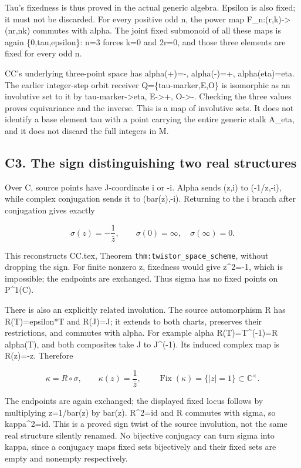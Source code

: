\documentclass[
]{article}
\newcounter{none} %
\begin{document}
Tau's fixedness is thus proved in the actual generic algebra. Epsilon is
also fixed; it must not be discarded. For every positive odd n, the
power map F\_n:(r,k)-\textgreater(nr,nk) commutes with alpha. The joint
fixed submonoid of all these maps is again \{0,tau,epsilon\}: n=3 forces
k=0 and 2r=0, and those three elements are fixed for every odd n.

CC's underlying three-point space has alpha(+)=-, alpha(-)=+,
alpha(eta)=eta. The earlier integer-step orbit receiver
Q=\{tau-marker,E,O\} is isomorphic as an involutive set to it by
tau-marker-\textgreater eta, E-\textgreater+, O-\textgreater-. Checking
the three values proves equivariance and the inverse. This is a map of
involutive sets. It does not identify a base element tau with a point
carrying the entire generic stalk A\_eta, and it does not discard the
full integers in M.

\subsection{C3. The sign distinguishing two real
structures}\label{c3.-the-sign-distinguishing-two-real-structures}

Over C, source points have J-coordinate i or -i. Alpha sends (z,i) to
(-1/z,-i), while complex conjugation sends it to (bar(z),-i). Returning
to the i branch after conjugation gives exactly

\[
\sigma(z)=-\frac1{\bar z},\qquad \sigma(0)=\infty,
\quad\sigma(\infty)=0.
\tag{C3.1}
\]

This reconstructs CC.tex, Theorem \texttt{thm:twistor\_space\_scheme},
without dropping the sign. For finite nonzero z, fixedness would give
\textbar z\textbar\^{}2=-1, which is impossible; the endpoints are
exchanged. Thus sigma has no fixed points on P\^{}1(C).

There is also an explicitly related involution. The source automorphism
R has R(T)=epsilon*T and R(J)=J; it extends to both charts, preserves
their restrictions, and commutes with alpha. For example alpha
R(T)=T\^{}(-1)=R alpha(T), and both composites take J to J\^{}(-1). Its
induced complex map is R(z)=-z. Therefore

\[
\kappa=R\circ\sigma,\qquad
\kappa(z)=\frac1{\bar z},\qquad
\operatorname{Fix}(\kappa)=\{|z|=1\}\subset\mathbb C^\times.
\tag{C3.2}
\]

The endpoints are again exchanged; the displayed fixed locus follows by
multiplying z=1/bar(z) by bar(z). R\^{}2=id and R commutes with sigma,
so kappa\^{}2=id. This is a proved sign twist of the source involution,
not the same real structure silently renamed. No bijective conjugacy can
turn sigma into kappa, since a conjugacy maps fixed sets bijectively and
their fixed sets are empty and nonempty respectively.
\end{document}
